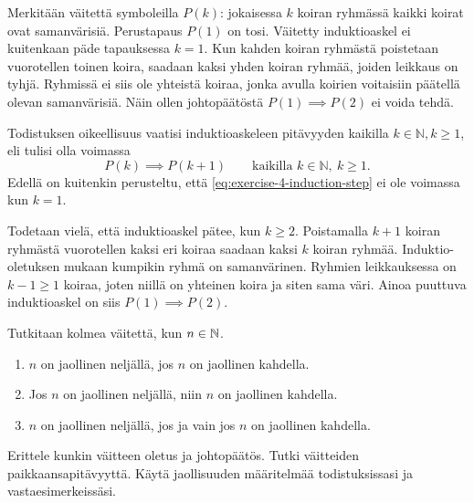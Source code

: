 \documentclass[11pt,a4paper]{amsart}
\begin{document}
\begin{solution}
  Merkitään väitettä symboleilla \(P(k)\): jokaisessa \(k\) koiran ryhmässä
  kaikki koirat ovat samanvärisiä. Perustapaus \(P(1)\) on tosi. Väitetty
  induktioaskel ei kuitenkaan päde tapauksessa \(k = 1\). Kun kahden koiran
  ryhmästä poistetaan vuorotellen toinen koira, saadaan kaksi yhden koiran
  ryhmää, joiden leikkaus on tyhjä. Ryhmissä ei siis ole yhteistä koiraa,
  jonka avulla koirien voitaisiin päätellä olevan samanvärisiä. Näin ollen
  johtopäätöstä \(P(1) \implies P(2)\) ei voida tehdä.

  Todistuksen oikeellisuus vaatisi induktioaskeleen pitävyyden kaikilla
  \(k \in \mathbb{N}, k \geq 1\), eli tulisi olla voimassa
  \begin{equation}\label{eq:exercise-4-induction-step}
    P(k) \implies P(k + 1)
    \qquad \text{kaikilla } k \in \mathbb{N},\ k \geq 1.
  \end{equation}
  Edellä on kuitenkin perusteltu, että \eqref{eq:exercise-4-induction-step} ei
  ole voimassa kun \(k = 1\).

  Todetaan vielä, että induktioaskel pätee, kun \(k \geq 2\).
  Poistamalla \(k + 1\) koiran ryhmästä vuorotellen kaksi eri koiraa saadaan
  kaksi \(k\) koiran ryhmää. Induktio-oletuksen mukaan kumpikin ryhmä on
  samanvärinen. Ryhmien leikkauksessa on \(k - 1 \geq 1\) koiraa, joten niillä
  on yhteinen koira ja siten sama väri. Ainoa puuttuva induktioaskel on siis
  \(P(1) \implies P(2)\).
\end{solution}

\begin{exercise}
  Tutkitaan kolmea väitettä, kun \(n \in \mathbb{N}\).
  \begin{enumerate}[label=(\arabic*), nosep]
    \item \(n\) on jaollinen neljällä, jos \(n\) on jaollinen kahdella.
    \item Jos \(n\) on jaollinen neljällä, niin \(n\) on jaollinen kahdella.
    \item \(n\) on jaollinen neljällä, jos ja vain jos \(n\) on
      jaollinen kahdella.
  \end{enumerate}
  Erittele kunkin väitteen oletus ja johtopäätös. Tutki väitteiden
  paikkaansapitävyyttä.
  Käytä jaollisuuden määritelmää todistuksissasi ja vastaesimerkeissäsi.
\end{exercise}
\end{document}
